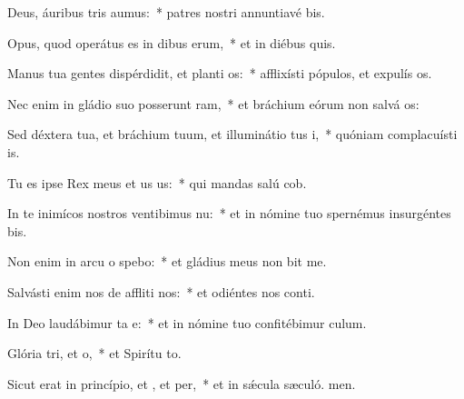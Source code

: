\item Deus, áuribus tris aumus:~* patres nostri annuntiavé bis.
\item Opus, quod operátus es in dibus erum,~* et in diébus quis.
\item Manus tua gentes dispérdidit, et planti os:~* afflixísti pópulos, et expulís os.
\item Nec enim in gládio suo posserunt ram,~* et bráchium eórum non salvá os:
\item Sed déxtera tua, et bráchium tuum, et illuminátio tus i,~* quóniam complacuísti  is.
\item Tu es ipse Rex meus et us us:~* qui mandas salú cob.
\item In te inimícos nostros ventibimus nu:~* et in nómine tuo spernémus insurgéntes  bis.
\item Non enim in arcu o spebo:~* et gládius meus non bit me.
\item Salvásti enim nos de affliti nos:~* et odiéntes nos conti.
\item In Deo laudábimur ta e:~* et in nómine tuo confitébimur  culum.
\item Glória tri, et o,~* et Spirítu to.
\item Sicut erat in princípio, et , et per,~* et in sǽcula sæculó. men.
